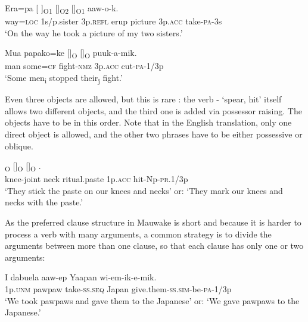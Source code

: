 \ea%
\label{ex:5:x948}
\gll Era=pa  [  ]\textsubscript{O1}  []\textsubscript{O2}  []\textsubscript{O1} aaw-o-k. \\
     way=\textsc{loc}  1s/p.sister  3p.\textsc{refl}  erup  picture  3p.\textsc{acc} take-\textsc{pa}-3s \\
\glt `On the way he took a picture of my two sisters.'
\z

\ea%
\label{ex:5:x949}
\gll Mua  papako=ke  []\textsubscript{O}  []\textsubscript{O}  puuk-a-mik. \\
     man  some=\textsc{cf}  fight-\textsc{nmz}  3p.\textsc{acc}  cut-\textsc{pa}-1/3p \\
\glt `Some men\textsubscript{i} stopped their\textsubscript{j} fight.'
\z

Even three objects are allowed, but this is rare : the verb - `spear, hit' itself allows two different objects, and the third one is added via possessor raising. The objects have to be in this order. Note that in the English translation, only one direct object is allowed, and the other two phrases have to be either possessive or oblique.

\ea%
\label{ex:5:x953}
\textsubscript{O}  []\textsubscript{O}  []\textsubscript{O}  . \\
     knee-joint  neck  ritual.paste  1p.\textsc{acc}  hit-Np-\textsc{pr}.1/3p \\
\glt `They stick the  paste on our knees and necks' or: `They mark our knees and necks with the  paste.'
\z

As the preferred clause structure in Mauwake is short and because it is harder to process a verb with many arguments, a common strategy is to divide the arguments between more than one clause, so that each clause has only one or two arguments:

\ea%
\label{ex:5:x967}
\gll I  dabuela  aaw-ep  Yaapan  wi-em-ik-e-mik. \\
     1p.\textsc{unm}  pawpaw  take-\textsc{ss}.\textsc{seq}  Japan  give.them-\textsc{ss}.\textsc{sim}-be-\textsc{pa}-1/3p \\
\glt `We took pawpaws and gave them to the Japanese' or: `We gave pawpaws to the Japanese.'
\z


